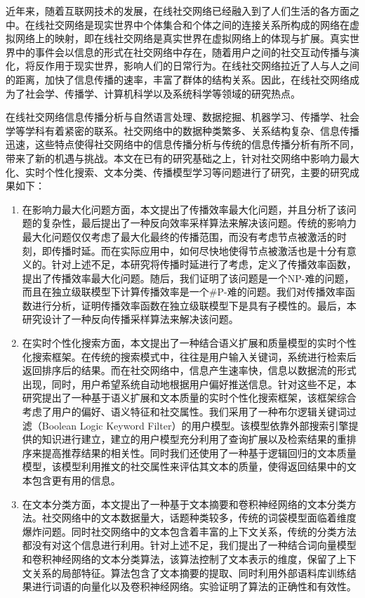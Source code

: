 \begin{cabstract}
近年来，随着互联网技术的发展，在线社交网络已经融入到了人们生活的各方面之中。在线社交网络是现实世界中个体集合和个体之间的连接关系所构成的网络在虚拟网络上的映射，即在线社交网络是真实世界在虚拟网络上的体现与扩展。真实世界中的事件会以信息的形式在社交网络中存在，随着用户之间的社交互动传播与演化，将反作用于现实世界，影响人们的日常行为。在线社交网络拉近了人与人之间的距离，加快了信息传播的速率，丰富了群体的结构关系。因此，在线社交网络成为了社会学、传播学、计算机科学以及系统科学等领域的研究热点。

在线社交网络信息传播分析与自然语言处理、数据挖掘、机器学习、传播学、社会学等学科有着紧密的联系。社交网络中的数据种类繁多、关系结构复杂、信息传播迅速，这些特点使得社交网络中的信息传播分析与传统的信息传播分析有所不同，带来了新的机遇与挑战。本文在已有的研究基础之上，针对社交网络中影响力最大化、实时个性化搜索、文本分类、传播模型学习等问题进行了研究，主要的研究成果如下：
\begin{enumerate}
	\item 在影响力最大化问题方面，本文提出了传播效率最大化问题，并且分析了该问题的复杂性，最后提出了一种反向效率采样算法来解决该问题。传统的影响力最大化问题仅仅考虑了最大化最终的传播范围，而没有考虑节点被激活的时刻，即传播时延。而在实际应用中，如何尽快地使得节点被激活也是十分有意义的。针对上述不足，本研究将传播时延进行了考虑，定义了传播效率函数，提出了传播效率最大化问题。随后，我们证明了该问题是一个NP-难的问题，而且在独立级联模型下计算传播效率是一个\#P-难的问题。我们对传播效率函数进行分析，证明传播效率函数在独立级联模型下是具有子模性的。最后，本研究设计了一种反向传播采样算法来解决该问题。
	\item 在实时个性化搜索方面，本文提出了一种结合语义扩展和质量模型的实时个性化搜索框架。在传统的搜索模式中，往往是用户输入关键词，系统进行检索后返回排序后的结果。而在社交网络中，信息产生速率快，信息以数据流的形式出现，同时，用户希望系统自动地根据用户偏好推送信息。针对这些不足，本研究提出了一种基于语义扩展和文本质量的实时个性化搜索框架，该框架综合考虑了用户的偏好、语义特征和社交属性。我们采用了一种布尔逻辑关键词过滤（Boolean Logic Keyword Filter）的用户模型。该模型依靠外部搜索引擎提供的知识进行建立，建立的用户模型充分利用了查询扩展以及检索结果的重排序来提高推荐结果的相关性。同时我们还使用了一种基于逻辑回归的文本质量模型，该模型利用推文的社交属性来评估其文本的质量，使得返回结果中的文本包含更有用的信息。
	\item 在文本分类方面，本文提出了一种基于文本摘要和卷积神经网络的文本分类方法。社交网络中的文本数据量大，话题种类较多，传统的词袋模型面临着维度爆炸问题。同时社交网络中的文本包含着丰富的上下文关系，传统的分类方法都没有对这个信息进行利用。针对上述不足，我们提出了一种结合词向量模型和卷积神经网络的文本分类算法，该算法控制了文本表示的维度，保留了上下文关系的局部特征。算法包含了文本摘要的提取、同时利用外部语料库训练结果进行词语的向量化以及卷积神经网络。实验证明了算法的正确性和有效性。

\end{enumerate}
\end{cabstract}
